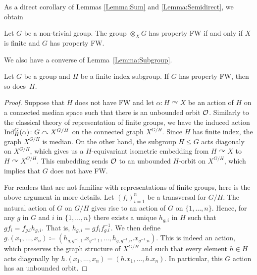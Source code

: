 As a direct corollary of Lemmas \ref{Lemma:Sum} and \ref{Lemma:Semidirect}, we obtain
\begin{cor}\label{Cor:Sum}
Let $G$ be a non-trivial group.
The group $\otimes_X G$ has property FW if and only if $X$ is finite and $G$ has property FW.
\end{cor}


We also have a converse of Lemma~\ref{Lemma:Subgroup}.
\begin{lem}\label{Lemma:Subgroup2}
Let $G$ be a group and $H$ be a finite index subgroup.
If $G$ has property FW, then so does~$H$.
\end{lem}
\begin{proof}
Suppose that $H$ does not have FW and let $\alpha\colon H\curvearrowright X$ be an action of $H$ on a connected median space such that there is an unbounded orbit $\mathcal O$.
Similarly to the classical theory of representation of finite groups, we have the induced  action $\operatorname{Ind}_H^G(\alpha)\colon G \curvearrowright X^{G/H}$ on the connected graph $X^{G/H}$. Since $H$ has finite index, the graph $X^{G/H}$ is median. On the other hand, the subgroup $H\leq G$ acts diagonaly on $X^{G/H}$, which gives us a $H$-equivariant isometric embedding from $H\curvearrowright X$ to $H\curvearrowright X^{G/H}$.
This embedding sends $\mathcal O$ to an unbounded $H$-orbit on $X^{G/H}$, which implies that $G$ does not have FW.

For readers that are not familiar with representations of finite groups, here is the above argument in more details.
Let $(f_i)_{i=1}^n$ be a transversal for $G/H$.
The natural action of $G$ on $G/H$ gives rise to an action of $G$ on $\{1,\dots,n\}$.
Hence, for any $g$ in $G$ and $i$ in $\{1,\dots,n\}$ there exists a unique $h_{g,i}$ in $H$ such that $gf_i=f_{g.i}h_{g,i}$. That is, $h_{g,i}=gf_if_{g.i}^{-1}$.
We then define $g.(x_1,\dots,x_n)\coloneqq(h_{g,g^{-1}.1}.x_{g^{-1}.1},\dots,h_{g,g^{-1}.n}.x_{g^{-1}.n})$. This is indeed an action, which preserves the graph structure of $X^{G/H}$ and such that every element $h\in H$ acts diagonally by $h.(x_1,\dots,x_n)=(h.x_1,\dots,h.x_n)$.
In particular, this $G$ action has an unbounded orbit.
\end{proof}







